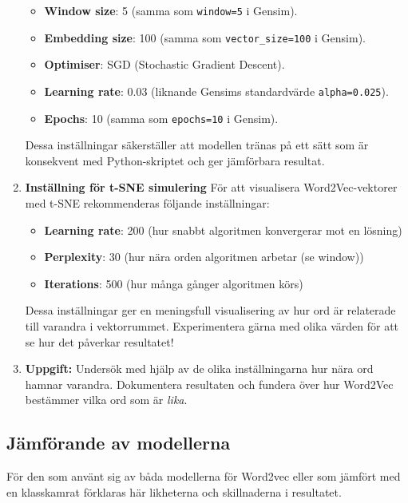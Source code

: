 \documentclass[a4paper, 12pt]{article}
\begin{document}
\begin{enumerate}
\begin{itemize}
    \item \textbf{Window size}: 5 (samma som \texttt{window=5} i Gensim).
    \item \textbf{Embedding size}: 100 (samma som \texttt{vector\_size=100} i Gensim).
    \item \textbf{Optimiser}: SGD (Stochastic Gradient Descent).
    \item \textbf{Learning rate}: 0.03 (liknande Gensims standardvärde \texttt{alpha=0.025}).
    \item \textbf{Epochs}: 10 (samma som \texttt{epochs=10} i Gensim).
\end{itemize}

\noindent
Dessa inställningar säkerställer att modellen tränas på ett sätt som är konsekvent med Python-skriptet och ger jämförbara resultat.

\item \textbf{Inställning för t-SNE simulering}
För att visualisera Word2Vec-vektorer med t-SNE rekommenderas följande inställningar:

\begin{itemize}
    \item \textbf{Learning rate}: 200 (hur snabbt algoritmen konvergerar mot en lösning)
    \item \textbf{Perplexity}: 30 (hur nära orden algoritmen arbetar (se window))
    \item \textbf{Iterations}: 500 (hur många gånger algoritmen körs)
\end{itemize}

\noindent
Dessa inställningar ger en meningsfull visualisering av hur ord är relaterade till varandra i vektorrummet. Experimentera gärna med olika värden för att se hur det påverkar resultatet!


    \item \textbf{Uppgift:} Undersök med hjälp av de olika inställningarna hur nära ord hamnar varandra. Dokumentera resultaten och fundera över hur Word2Vec bestämmer vilka ord som är \textit{lika}.
\end{enumerate}

\subsection{Jämförande av modellerna}
För den som använt sig av båda modellerna för Word2vec eller som jämfört med en klasskamrat förklaras här likheterna och skillnaderna i resultatet.
\end{document}
